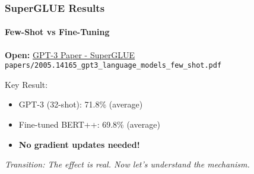 \documentclass[10pt,aspectratio=169]{beamer}
\begin{document}
\begin{frame}
\frametitle{SuperGLUE Results}
\framesubtitle{Few-Shot vs Fine-Tuning}

\begin{center}
\Large
\textbf{Open:} \href{papers/2005.14165_gpt3_language_models_few_shot.pdf}{\color{blue}GPT-3 Paper - SuperGLUE}\\\small{\texttt{papers/2005.14165\_gpt3\_language\_models\_few\_shot.pdf}}
\end{center}

\vspace{1cm}

Key Result:
\begin{itemize}
    \item GPT-3 (32-shot): 71.8\% (average)
    \item Fine-tuned BERT++: 69.8\% (average)
    \item \textbf{No gradient updates needed!}
\end{itemize}

\vspace{1cm}
\textit{Transition: The effect is real. Now let's understand the mechanism.}
\end{frame}

\end{document}

